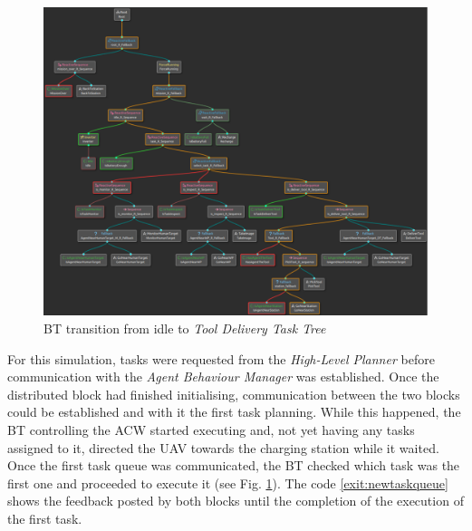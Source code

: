 \begin{figure}[htbp]
    \centering
    \includegraphics[width=.75\linewidth]{Results/figures/BTnoIdle.pdf}
    \caption{\gls{BT} transition from idle to \emph{Tool Delivery Task Tree}}
    \label{fig:NoIdle_DeliverToolTaskTree}
\end{figure}

For this simulation, tasks were requested from the \emph{High-Level Planner} before communication with the \emph{Agent Behaviour Manager} was established. Once the distributed block had finished initialising, communication between the two blocks could be established and with it the first task planning. While this happened, the \gls{BT} controlling the \gls{ACW} started executing and, not yet having any tasks assigned to it, directed the \gls{UAV} towards the charging station while it waited. Once the first task queue was communicated, the \gls{BT} checked which task was the first one and proceeded to execute it (see Fig. \ref{fig:NoIdle_DeliverToolTaskTree}). The code \ref{exit:newtaskqueue} shows the feedback posted by both blocks until the completion of the execution of the first task.

